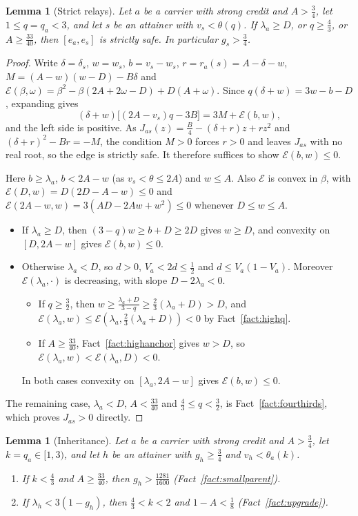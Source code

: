 \documentclass[11pt,a4paper]{article}
\numberwithin{equation}{section}
\newtheorem{lemma}[theorem]{Lemma}
\theoremstyle{definition}
\newcommand{\cE}{\mathcal E}
\begin{document}
\begin{lemma}[Strict relays]\label{lem:relay}
Let $a$ be a carrier with strong credit and $A>\frac34$, let $1\le q=q_a<3$,
and let $s$ be an attainer with $v_s<\theta(q)$. If $\lambda_a\ge D$, or
$q\ge\frac43$, or $A\ge\frac{33}{40}$, then $[e_a,e_s]$ is strictly safe. In
particular $g_s>\frac34$.
\end{lemma}

\begin{proof}
Write $\delta=\delta_s$, $w=w_s$, $b=v_s-w_s$, $r=r_a(s)=A-\delta-w$,
$M=(A-w)(w-D)-B\delta$ and
$\cE(\beta,\omega)=\beta^2-\beta(2A+2\omega-D)+D(A+\omega)$. Since
$q(\delta+w)=3w-b-D$, expanding gives
\begin{equation}\label{eq:relay}
(\delta+w)\bigl[(2A-v_s)q-3B\bigr]=3M+\cE(b,w),
\end{equation}
and the left side is positive. As $J_{as}(z)=\frac B4-(\delta+r)z+rz^2$ and
$(\delta+r)^2-Br=-M$, the condition $M>0$ forces $r>0$ and leaves $J_{as}$ with
no real root, so the edge is strictly safe. It therefore suffices to show
$\cE(b,w)\le0$.

Here $b\ge\lambda_a$, $b<2A-w$ (as $v_s<\theta\le2A$) and $w\le A$. Also $\cE$
is convex in $\beta$, with
$\cE(D,w)=D(2D-A-w)\le0$ and $\cE(2A-w,w)=3(AD-2Aw+w^2)\le0$ whenever $D\le w\le A$.
\begin{itemize}
\item If $\lambda_a\ge D$, then $(3-q)w\ge b+D\ge2D$ gives $w\ge D$, and
convexity on $[D,2A-w]$ gives $\cE(b,w)\le0$.
\item Otherwise $\lambda_a<D$, so $d>0$, $V_a<2d\le\frac12$ and
$d\le V_a(1-V_a)$. Moreover $\cE(\lambda_a,\cdot)$ is decreasing, with slope
$D-2\lambda_a<0$.
\begin{itemize}
\item If $q\ge\frac32$, then $w\ge\frac{\lambda_a+D}{3-q}\ge\frac23(\lambda_a+D)>D$,
and $\cE(\lambda_a,w)\le\cE(\lambda_a,\frac23(\lambda_a+D))<0$ by
Fact~\ref{fact:highq}.
\item If $A\ge\frac{33}{40}$, Fact~\ref{fact:highanchor} gives $w>D$, so
$\cE(\lambda_a,w)<\cE(\lambda_a,D)<0$.
\end{itemize}
In both cases convexity on $[\lambda_a,2A-w]$ gives $\cE(b,w)\le0$.
\end{itemize}
The remaining case, $\lambda_a<D$, $A<\frac{33}{40}$ and
$\frac43\le q<\frac32$, is Fact~\ref{fact:fourthirds}, which proves
$J_{as}>0$ directly.
\end{proof}

\begin{lemma}[Inheritance]\label{lem:inherit}Let $a$ be a carrier with strong credit and $A>\frac34$, let $k=q_a\in[1,3)$,
and let $h$ be an attainer with $g_h\ge\frac34$ and $v_h<\theta_a(k)$.
\begin{enumerate}[label=(\alph*)]
\item If $k<\frac43$ and $A\ge\frac{33}{40}$, then $g_h>\frac{1281}{1600}$
(Fact~\ref{fact:smallparent}).
\item If $\lambda_h<3(1-g_h)$, then $\frac43<k<2$ and $1-A<\frac18$
(Fact~\ref{fact:upgrade}).
\end{enumerate}
\end{lemma}
\end{document}
